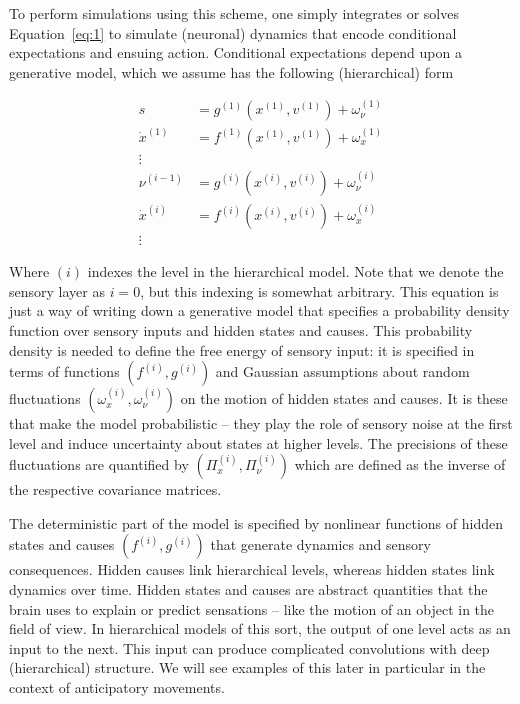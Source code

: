 \documentclass[a4paper]{article} %
\begin{document}
To perform simulations using this scheme, one simply integrates or
solves Equation~\ref{eq:1} to simulate (neuronal) dynamics that encode
conditional expectations and ensuing action. Conditional expectations
depend upon a generative model, which we assume has the following
(hierarchical) form

\begin{align}
s &= g^{(1)}(x^{(1)}, v^{(1)}) + \omega^{(1)}_\nu \nonumber \\%
\dot{x}^{(1)} &= f^{(1)}(x^{(1)}, v^{(1)}) + \omega_x^{(1)}  \nonumber  \\%
\vdots  \label{eq:2} \\%
\nu^{(i-1)} &= g^{(i)}(x^{(i)}, v^{(i)}) + \omega^{(i)}_\nu \nonumber \\%
\dot{x}^{(i)} &= f^{(i)}(x^{(i)}, v^{(i)}) + \omega_x^{(i)}  \nonumber  \\%
\vdots \nonumber  %
\end{align}%

Where $(i)$ indexes the level in the hierarchical model. Note that we denote the sensory layer as $i=0$, but this indexing is somewhat arbitrary. %
This equation is just a way of writing down a generative model that
specifies a probability density function over sensory inputs and hidden
states and causes. This probability density is needed to define the free
energy of sensory input: it is specified in terms of functions $(f^{(i)} , g^{(i)})$ and Gaussian assumptions about random fluctuations $(\omega^{(i)}_x, \omega^{(i)}_\nu)$ on
the motion of hidden states and causes. It is these that make the model
probabilistic -- they play the role of sensory noise at the first level
and induce uncertainty about states at higher levels. The precisions of
these fluctuations are quantified by $(\Pi^{(i)}_x, \Pi^{(i)}_\nu)$ 
which are defined as the inverse of the respective covariance matrices.

The deterministic part of the model is specified by nonlinear functions of hidden states and causes $(f^{(i)} , g^{(i)})$ that generate dynamics and sensory
consequences. Hidden causes link hierarchical levels, whereas hidden
states link dynamics over time. Hidden states and causes are abstract
quantities that the brain uses to explain or predict sensations -- like
the motion of an object in the field of view. In hierarchical models of
this sort, the output of one level acts as an input to the next. This
input can produce complicated convolutions with deep (hierarchical)
structure. We will see examples of this later in particular in the
context of anticipatory movements.
\end{document}

